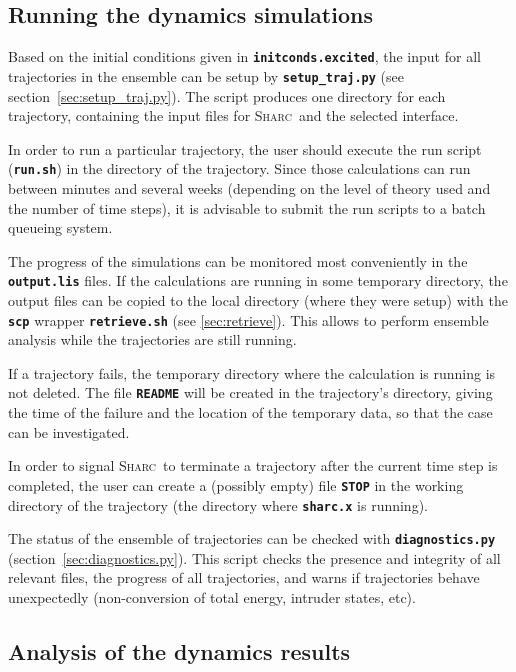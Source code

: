 \documentclass[a4paper,10pt,DIV=15,openany]{scrbook}
\newcommand{\sharc}{\textsc{Sharc}}
\newcommand{\ttt}[1]{\textbf{\texttt{#1}}}
\begin{document}
\subsection{Running the dynamics simulations}

Based on the initial conditions given in \ttt{initconds.excited}, the input for all trajectories in the ensemble can be setup by \ttt{setup\_traj.py} (see section~\ref{sec:setup_traj.py}). The script produces one directory for each trajectory, containing the input files for \sharc\ and the selected interface.

In order to run a particular trajectory, the user should execute the run script (\ttt{run.sh}) in the directory of the trajectory. Since those calculations can run between minutes and several weeks (depending on the level of theory used and the number of time steps), it is advisable to submit the run scripts to a batch queueing system. 

The progress of the simulations can be monitored most conveniently in the \ttt{output.lis} files. If the calculations are running in some temporary directory, the output files can be copied to the local directory (where they were setup) with the \ttt{scp} wrapper \ttt{retrieve.sh} (see \ref{sec:retrieve}). This allows to perform ensemble analysis while the trajectories are still running.

If a trajectory fails, the temporary directory where the calculation is running is not deleted. The file \ttt{README} will be created in the trajectory's directory, giving the time of the failure and the location of the temporary data, so that the case can be investigated. 

In order to signal \sharc\ to terminate a trajectory after the current time step is completed, the user can create a (possibly empty) file \ttt{STOP} in the working directory of the trajectory (the directory where \ttt{sharc.x} is running).

The status of the ensemble of trajectories can be checked with \ttt{diagnostics.py} (section~\ref{sec:diagnostics.py}). This script checks the presence and integrity of all relevant files, the progress of all trajectories, and warns if trajectories behave unexpectedly (non-conversion of total energy, intruder states, etc).

\subsection{Analysis of the dynamics results}
\end{document}
